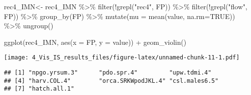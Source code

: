 \documentclass[
]{article}
\newenvironment{Shaded}{\begin{snugshade}}{\end{snugshade}}
\newcommand{\AttributeTok}[1]{\textcolor[rgb]{0.77,0.63,0.00}{#1}}
\newcommand{\ConstantTok}[1]{\textcolor[rgb]{0.00,0.00,0.00}{#1}}
\newcommand{\FunctionTok}[1]{\textcolor[rgb]{0.00,0.00,0.00}{#1}}
\newcommand{\NormalTok}[1]{#1}
\newcommand{\OtherTok}[1]{\textcolor[rgb]{0.56,0.35,0.01}{#1}}
\newcommand{\SpecialCharTok}[1]{\textcolor[rgb]{0.00,0.00,0.00}{#1}}
\newcommand{\StringTok}[1]{\textcolor[rgb]{0.31,0.60,0.02}{#1}}
\begin{document}
\begin{Shaded}
\begin{Highlighting}[]
\NormalTok{rec4\_IMN}\OtherTok{\textless{}{-}}\NormalTok{  rec4\_IMN  }\SpecialCharTok{\%\textgreater{}\%} 
  \FunctionTok{filter}\NormalTok{(}\SpecialCharTok{!}\FunctionTok{grepl}\NormalTok{(}\StringTok{"rec4"}\NormalTok{, FP)) }\SpecialCharTok{\%\textgreater{}\%} 
  \FunctionTok{filter}\NormalTok{(}\SpecialCharTok{!}\FunctionTok{grepl}\NormalTok{(}\StringTok{"flow"}\NormalTok{, FP)) }\SpecialCharTok{\%\textgreater{}\%} 
  \FunctionTok{group\_by}\NormalTok{(FP) }\SpecialCharTok{\%\textgreater{}\%} 
  \FunctionTok{mutate}\NormalTok{(}\AttributeTok{mu =} \FunctionTok{mean}\NormalTok{(value, }\AttributeTok{na.rm=}\ConstantTok{TRUE}\NormalTok{)) }\SpecialCharTok{\%\textgreater{}\%}
  \FunctionTok{ungroup}\NormalTok{()}

\FunctionTok{ggplot}\NormalTok{(rec4\_IMN, }\FunctionTok{aes}\NormalTok{(}\AttributeTok{x =}\NormalTok{ FP, }\AttributeTok{y =}\NormalTok{ value)) }\SpecialCharTok{+} 
  \FunctionTok{geom\_violin}\NormalTok{()}
\end{Highlighting}
\end{Shaded}

\texttt{[image: 4\_Vis\_IS\_results\_files/figure-latex/unnamed-chunk-11-1.pdf]}

\begin{Shaded}
\end{Shaded}

\begin{verbatim}
## [1] "npgo.yrsum.3"      "pdo.spr.4"         "upw.tdmi.4"       
## [4] "harv.COL.4"        "orca.SRKWpodJKL.4" "csl.males6.5"     
## [7] "hatch.all.1"
\end{verbatim}
\end{document}

